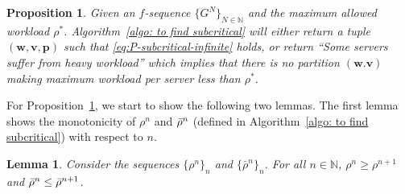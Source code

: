 \documentclass[11pt, reqno]{article}
\newtheorem{lemma}[theorem]{Lemma}
\newtheorem{prop}[theorem]{Proposition}
\numberwithin{equation}{section}
\numberwithin{theorem}{section}
\newcommand{\N}{\mathbb{N}}                 %
\begin{document}
\begin{prop}\label{prop:algo-find-subcritical}
Given an $f$-sequence $\{G^N\}_{N\in\N}$ and the maximum allowed workload $\rho^*$. Algorithm~\ref{algo: to find subcritical} will either return a tuple  $(\mathbf{w},\mathbf{v},\mathbf{p})$ such that \eqref{eq:P-subcritical-infinite} holds, or return ``Some servers suffer from heavy workload'' which implies that there is no partition $(\mathbf{w}.\mathbf{v})$ making maximum workload per server less than $\rho^*$.
\end{prop}
For Proposition~\ref{prop:algo-find-subcritical}, we start to show the following two lemmas. The first lemma shows the monotonicity of $\rho^n$ and $\Bar{\rho}^n$ (defined in Algorithm~\ref{algo: to find subcritical}) with respect to $n$.
\begin{lemma}\label{lem:monotonicity-rho}
    Consider the sequences $\{\rho^n\}_n$ and $\{\bar{\rho}^n\}_n$. For all $n\in\N$, $\rho^n\geq \rho^{n+1}$ and $\Bar{\rho}^n\leq \Bar{\rho}^{n+1}$.
\end{lemma}
\end{document}

